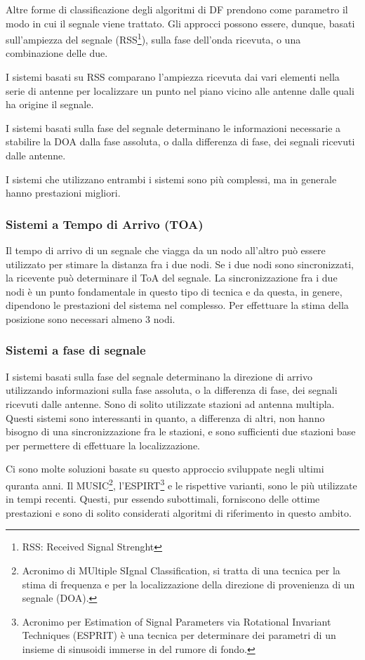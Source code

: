 Altre forme di classificazione degli algoritmi di DF prendono come parametro il modo in cui il segnale viene trattato. Gli approcci possono essere, dunque, basati sull'ampiezza del segnale (RSS\footnote{RSS: Received Signal Strenght}), sulla fase	dell'onda ricevuta, o una combinazione delle due. 

I sistemi basati su RSS comparano l'ampiezza ricevuta dai vari elementi nella serie di antenne per localizzare un punto nel piano vicino alle antenne dalle quali ha origine il segnale. 

I sistemi basati sulla fase del segnale determinano le informazioni necessarie a stabilire la DOA dalla fase assoluta, o dalla differenza di fase, dei segnali ricevuti dalle antenne. 

I sistemi che utilizzano entrambi i sistemi sono più complessi, ma in generale hanno prestazioni migliori.

\subsubsection{Sistemi a Tempo di Arrivo (TOA)}

Il tempo di arrivo di un segnale che viagga da un nodo all'altro può essere utilizzato per stimare la distanza fra i due nodi. Se i due nodi sono sincronizzati, la ricevente può determinare il ToA del segnale. La sincronizzazione fra i due nodi è un punto fondamentale in questo tipo di tecnica e da questa, in genere, dipendono le prestazioni del sistema nel complesso. Per effettuare la stima della posizione sono necessari almeno 3 nodi.

\subsubsection{Sistemi a fase di segnale }

I sistemi basati sulla fase del segnale determinano la direzione di arrivo utilizzando informazioni sulla fase assoluta, o la differenza di fase, dei segnali ricevuti dalle antenne. Sono di solito utilizzate stazioni ad antenna multipla. Questi sistemi sono interessanti in quanto, a differenza di altri, non hanno bisogno di una sincronizzazione fra le stazioni, e sono sufficienti due stazioni base per permettere	di effettuare la localizzazione. 

Ci sono molte soluzioni basate su questo approccio sviluppate negli ultimi quranta anni. Il MUSIC\footnote{Acronimo di MUltiple SIgnal Classification, si tratta di una tecnica per la stima di frequenza e per la localizzazione della direzione di provenienza di un segnale (DOA).}, l'ESPIRT\footnote{Acronimo per Estimation of Signal Parameters via Rotational Invariant Techniques (ESPRIT) è una tecnica per determinare dei parametri di un insieme di sinusoidi immerse in del rumore di fondo.} e le rispettive varianti, sono le più utilizzate in tempi recenti. Questi, pur essendo subottimali, forniscono delle ottime prestazioni e sono di solito considerati algoritmi di riferimento in questo ambito.

